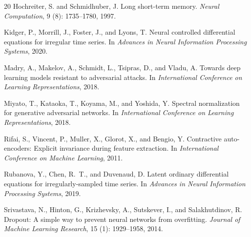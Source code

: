 \documentclass[11pt]{article}
\begin{document}
\begin{thebibliography}{20}
Hochreiter, S. and Schmidhuber, J.
\newblock Long short-term memory.
\newblock \emph{Neural Computation}, 9 (8): 1735--1780, 1997.

Kidger, P., Morrill, J., Foster, J., and Lyons, T.
\newblock Neural controlled differential equations for irregular time series.
\newblock In \emph{Advances in Neural Information Processing Systems}, 2020.

Madry, A., Makelov, A., Schmidt, L., Tsipras, D., and Vladu, A.
\newblock Towards deep learning models resistant to adversarial attacks.
\newblock In \emph{International Conference on Learning Representations}, 2018.

Miyato, T., Kataoka, T., Koyama, M., and Yoshida, Y.
\newblock Spectral normalization for generative adversarial networks.
\newblock In \emph{International Conference on Learning Representations}, 2018.

Rifai, S., Vincent, P., Muller, X., Glorot, X., and Bengio, Y.
\newblock Contractive auto-encoders: Explicit invariance during feature extraction.
\newblock In \emph{International Conference on Machine Learning}, 2011.

Rubanova, Y., Chen, R.~T., and Duvenaud, D.
\newblock Latent ordinary differential equations for irregularly-sampled time series.
\newblock In \emph{Advances in Neural Information Processing Systems}, 2019.

Srivastava, N., Hinton, G., Krizhevsky, A., Sutskever, I., and Salakhutdinov, R.
\newblock Dropout: A simple way to prevent neural networks from overfitting.
\newblock \emph{Journal of Machine Learning Research}, 15 (1): 1929--1958, 2014.

\end{thebibliography}
\end{document}
